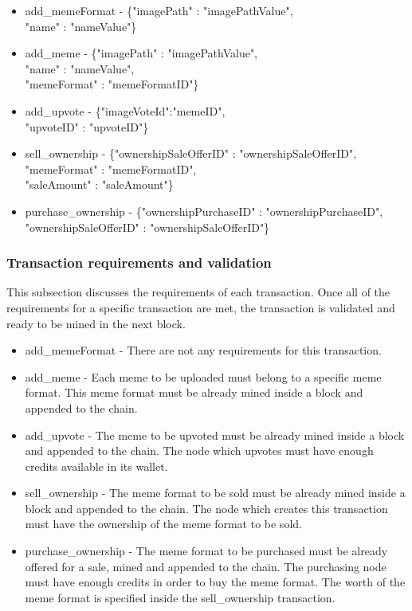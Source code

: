 \documentclass[12pt]{article}
\begin{document}
\begin{itemize}
\item add\_memeFormat - \{"imagePath" : "imagePathValue",\\ "name" : "nameValue"\}

\item add\_meme - \{"imagePath" : "imagePathValue",\\ "name" : "nameValue",\\ "memeFormat" : "memeFormatID"\}

\item add\_upvote - \{"imageVoteId":"memeID",\\ "upvoteID" : "upvoteID"\}

\item sell\_ownership - \{"ownershipSaleOfferID" : "ownershipSaleOfferID",\\ "memeFormat" : "memeFormatID",\\ "saleAmount" : "saleAmount"\}

\item purchase\_ownership - \{"ownershipPurchaseID" : "ownershipPurchaseID",\\ "ownershipSaleOfferID" : "ownershipSaleOfferID"\}
\end{itemize}

\subsubsection{Transaction requirements and validation}

This subsection discusses the requirements of each transaction. Once all of the requirements for a specific transaction are met, the transaction is validated and ready to be mined in the next block.

\begin{itemize}
\item add\_memeFormat - There are not any requirements for this transaction.

\item add\_meme - Each meme to be uploaded must belong to a specific meme format. This meme format must be already mined inside a block and appended to the chain.

\item add\_upvote - The meme to be upvoted must be already mined inside a block and appended to the chain. The node which upvotes must have enough credits available in its wallet.

\item sell\_ownership - The meme format to be sold must be already mined inside a block and appended to the chain. The node which creates this transaction must have the ownership of the meme format to be sold.

\item purchase\_ownership - The meme format to be purchased must be already offered for a sale, mined and appended to the chain. The purchasing node must have enough credits in order to buy the meme format. The worth of the meme format is specified inside the sell\_ownership transaction.
\end{itemize}
\end{document}
